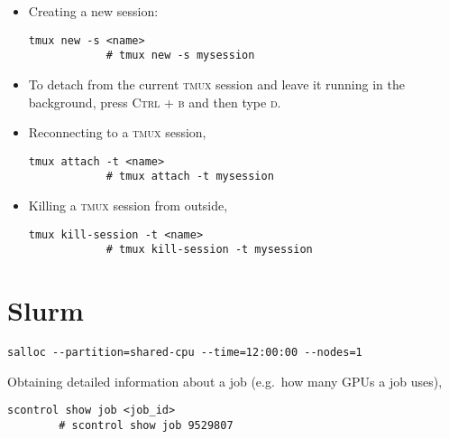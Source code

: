 \documentclass[12pt, a4paper]{scrbook}
\numberwithin{equation}{section}
\theoremstyle{definition}
\theoremstyle{definition}
\begin{document}
	\begin{itemize}
		\item Creating a new session:
		
		\begin{lstlisting}[style=mystylebash, label=alg:tmux_sess_creation, xleftmargin=\parindent]
			tmux new -s <name>
			# tmux new -s mysession
		\end{lstlisting}
	
		\item To detach from the current \textsc{tmux} session and leave it running in the background, press \textsc{Ctrl + b} and then type \textsc{d}.
		
		\item Reconnecting to a \textsc{tmux} session,
		
		\begin{lstlisting}[style=mystylebash, label=alg:tmux_sess_reconnect, xleftmargin=\parindent]
			tmux attach -t <name>
			# tmux attach -t mysession
		\end{lstlisting}
	
		\item Killing a \textsc{tmux} session from outside,
		
		\begin{lstlisting}[style=mystylebash, label=alg:tmux_sess_kill, xleftmargin=\parindent]
			tmux kill-session -t <name>
			# tmux kill-session -t mysession
		\end{lstlisting}
	\end{itemize}


	\chapter{Slurm}
	
	\begin{lstlisting}[style=mystylebash, xleftmargin=\parindent]
		salloc --partition=shared-cpu --time=12:00:00 --nodes=1
	\end{lstlisting}

	Obtaining detailed information about a job (e.g.~how many GPUs a job uses),
	
	\begin{lstlisting}[style=mystylebash, xleftmargin=\parindent]
		scontrol show job <job_id>
		# scontrol show job 9529807
	\end{lstlisting}
	
\end{document}
